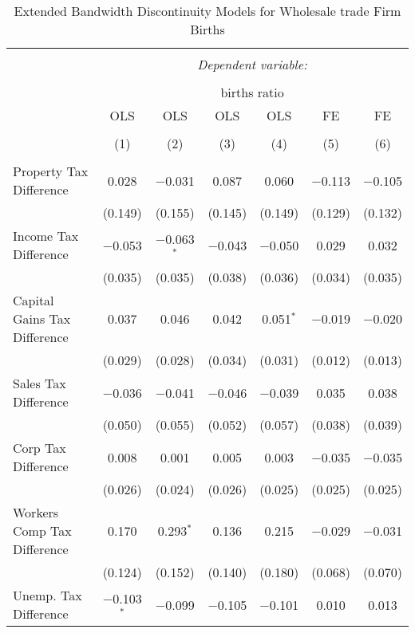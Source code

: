 
\begin{table}[!htbp] \centering 
  \caption{Extended Bandwidth Discontinuity Models for  Wholesale trade Firm Births} 
  \label{42eb} 
\footnotesize 
\begin{tabular}{@{\extracolsep{5pt}}lcccccc} 
\\[-1.8ex]\hline 
\hline \\[-1.8ex] 
 & \multicolumn{6}{c}{\textit{Dependent variable:}} \\ 
\cline{2-7} 
\\[-1.8ex] & \multicolumn{6}{c}{births ratio} \\ 
 & OLS & OLS & OLS & OLS & FE & FE \\ 
\\[-1.8ex] & (1) & (2) & (3) & (4) & (5) & (6)\\ 
\hline \\[-1.8ex] 
 Property Tax Difference & 0.028 & $-$0.031 & 0.087 & 0.060 & $-$0.113 & $-$0.105 \\ 
  & (0.149) & (0.155) & (0.145) & (0.149) & (0.129) & (0.132) \\ 
  Income Tax Difference & $-$0.053 & $-$0.063$^{*}$ & $-$0.043 & $-$0.050 & 0.029 & 0.032 \\ 
  & (0.035) & (0.035) & (0.038) & (0.036) & (0.034) & (0.035) \\ 
  Capital Gains Tax Difference & 0.037 & 0.046 & 0.042 & 0.051$^{*}$ & $-$0.019 & $-$0.020 \\ 
  & (0.029) & (0.028) & (0.034) & (0.031) & (0.012) & (0.013) \\ 
  Sales Tax Difference & $-$0.036 & $-$0.041 & $-$0.046 & $-$0.039 & 0.035 & 0.038 \\ 
  & (0.050) & (0.055) & (0.052) & (0.057) & (0.038) & (0.039) \\ 
  Corp Tax Difference & 0.008 & 0.001 & 0.005 & 0.003 & $-$0.035 & $-$0.035 \\ 
  & (0.026) & (0.024) & (0.026) & (0.025) & (0.025) & (0.025) \\ 
  Workers Comp Tax Difference & 0.170 & 0.293$^{*}$ & 0.136 & 0.215 & $-$0.029 & $-$0.031 \\ 
  & (0.124) & (0.152) & (0.140) & (0.180) & (0.068) & (0.070) \\ 
  Unemp. Tax Difference & $-$0.103$^{*}$ & $-$0.099 & $-$0.105 & $-$0.101 & 0.010 & 0.013 \\ 

\end{tabular}
\end{table}
